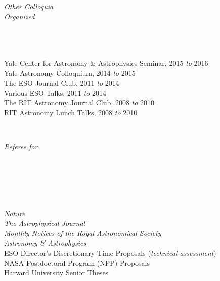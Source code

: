 \documentclass[11pt]{article}
\begin{document}
\vspace{4mm}


\hspace{2.5mm} \parbox{1.5in}{\textit{Other Colloquia \\ Organized \\\\\\\\} } \parbox{5.15in}{Yale Center for Astronomy \& Astrophysics Seminar, 2015 \textit{to} 2016 \\ Yale Astronomy Colloquium, 2014 \textit{to} 2015 \\ The ESO Journal Club, 2011 \textit{to} 2014 \\ Various ESO Talks, 2011 \textit{to} 2014 \\ The RIT Astronomy Journal Club, 2008 \textit{to} 2010 \\ RIT Astronomy Lunch Talks, 2008 \textit{to} 2010 }\\


\vspace{4mm}


\hspace{2.5mm} \parbox{1.5in}{\textit{Referee for \\\\\\\\\\\\}} \parbox{5.15in}{
\textit{Nature}\\
\textit{The Astrophysical Journal}\\
\textit{Monthly Notices of the Royal Astronomical Society}\\
\textit{Astronomy \& Astrophysics}\\
ESO Director's Discretionary Time Proposals (\textit{technical assessment}) \\
NASA Postdoctoral Program (NPP) Proposals \\
Harvard University Senior Theses} \\

\vspace{4mm}
\end{document}
